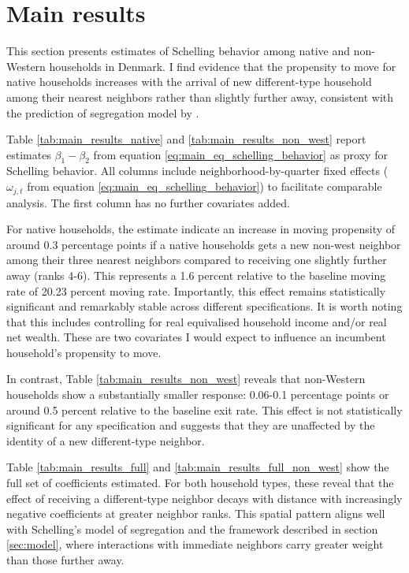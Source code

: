 \documentclass[../main.tex]{subfiles}
\begin{document}
\section{Main results}
\label{sec:results}

This section presents estimates of Schelling behavior among native and non-Western households in Denmark. I find evidence that the propensity to move for native households increases with the arrival of new different-type household among their nearest neighbors rather than slightly further away, consistent with the prediction of segregation model by \textcite{schelling1971dynamic}. 

Table \ref{tab:main_results_native} and \ref{tab:main_results_non_west} report estimates $\beta_1-\beta_2$ from equation \ref{eq:main_eq_schelling_behavior} as proxy for Schelling behavior. All columns include neighborhood-by-quarter fixed effects ($\omega_{j,t}$ from equation \ref{eq:main_eq_schelling_behavior}) to facilitate comparable analysis. The first column has no further covariates added. 

For native households, the estimate indicate an increase in moving propensity of around 0.3 percentage points if a native households gets a new non-west neighbor among their three nearest neighbors compared to receiving one slightly further away (ranks 4-6). This represents a 1.6 percent relative to the baseline moving rate of 20.23 percent moving rate. Importantly, this effect remains statistically significant and remarkably stable across different specifications. It is worth noting that this includes controlling for real equivalised household income and/or real net wealth. These are two covariates I would expect to influence an incumbent household's propensity to move.  

In contrast, Table \ref{tab:main_results_non_west} reveals that non-Western households show a substantially smaller response: 0.06-0.1 percentage points or around 0.5 percent relative to the baseline exit rate. This effect is not statistically significant for any specification and suggests that they are unaffected by the identity of a new different-type neighbor.

Table \ref{tab:main_results_full} and \ref{tab:main_results_full_non_west} show the full set of coefficients estimated. For both household types, these reveal that the effect of receiving a different-type neighbor decays with distance with increasingly negative coefficients at greater neighbor ranks. This spatial pattern aligns well with Schelling's model of segregation and the framework described in section \ref{sec:model}, where interactions with immediate neighbors carry greater weight than those further away.
\end{document}
